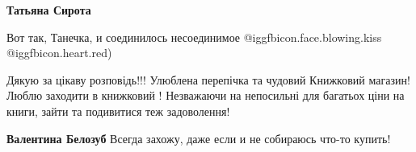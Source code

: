 \begin{itemize}
\textbf{Татьяна Сирота} 

Вот так, Танечка, и соединилось несоединимое  @igg{fbicon.face.blowing.kiss}
@igg{fbicon.heart.red})


Дякую за цікаву розповідь!!! Улюблена перепічка та чудовий Книжковий магазин!
Люблю заходити в книжковий ! Незважаючи на непосильні для багатьох ціни на
книги, зайти та подивитися теж задоволення!

\textbf{Валентина Белозуб} Всегда захожу, даже если и не собираюсь что-то купить!

\end{itemize} %
